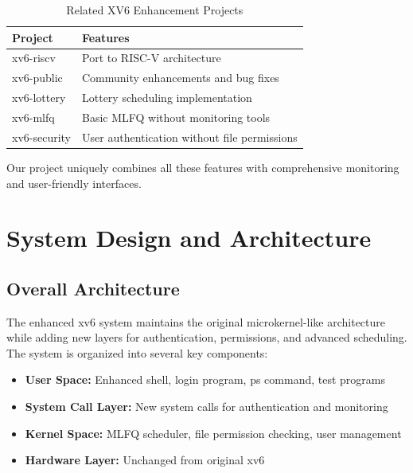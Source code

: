 \documentclass[a4paper,12pt]{report}
\begin{document}
\begin{table}[H]
\centering
\begin{tabular}{|l|p{10cm}|}
\hline
\textbf{Project} & \textbf{Features} \\
\hline
xv6-riscv & Port to RISC-V architecture \\
xv6-public & Community enhancements and bug fixes \\
xv6-lottery & Lottery scheduling implementation \\
xv6-mlfq & Basic MLFQ without monitoring tools \\
xv6-security & User authentication without file permissions \\
\hline
\end{tabular}
\caption{Related XV6 Enhancement Projects}
\label{tab:related_work}
\end{table}

Our project uniquely combines all these features with comprehensive monitoring and user-friendly interfaces.

\newpage

\chapter{System Design and Architecture}
\thispagestyle{contentpages}
\justifying

\section{Overall Architecture}

The enhanced xv6 system maintains the original microkernel-like architecture while adding new layers for authentication, permissions, and advanced scheduling. The system is organized into several key components:

\begin{itemize}
    \item \textbf{User Space:} Enhanced shell, login program, ps command, test programs
    \item \textbf{System Call Layer:} New system calls for authentication and monitoring
    \item \textbf{Kernel Space:} MLFQ scheduler, file permission checking, user management
    \item \textbf{Hardware Layer:} Unchanged from original xv6
\end{itemize}
\end{document}
